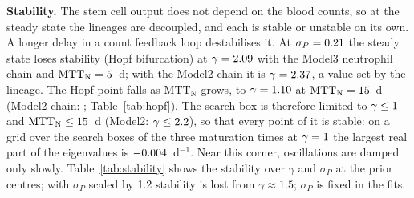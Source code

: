 \documentclass[11pt]{article}
\begin{document}
\textbf{Stability.} The stem cell output does not depend on the blood counts, so at the steady state the lineages are decoupled, and each is stable or unstable on its own. A longer delay in a count feedback loop destabilises it. At $\sigma_P=0.21$ the steady state loses stability (Hopf bifurcation) at $\gamma=2.09$ with the Model3 neutrophil chain and $\mathrm{MTT}_{\mathrm{N}}=5$~d; with the Model2 chain it is $\gamma=2.37$, a value set by the \valHopfOtherLineage{} lineage. The Hopf point falls as $\mathrm{MTT}_{\mathrm{N}}$ grows, to $\gamma=1.10$ at $\mathrm{MTT}_{\mathrm{N}}=15$~d (Model2 chain: \valHopfMttHiModelTwo; Table~\ref{tab:hopf}). The search box is therefore limited to $\gamma\leq1$ and $\mathrm{MTT}_{\mathrm{N}}\leq15$~d (Model2: $\gamma\leq2.2$), so that every point of it is stable: on a grid over the search boxes of the three maturation times at $\gamma=1$ the largest real part of the eigenvalues is $-0.004$~d$^{-1}$. Near this corner, oscillations are damped only slowly. Table~\ref{tab:stability} shows the stability over $\gamma$ and $\sigma_P$ at the prior centres; with $\sigma_P$ scaled by 1.2 stability is lost from $\gamma\approx1.5$; $\sigma_P$ is fixed in the fits.


\end{document}
